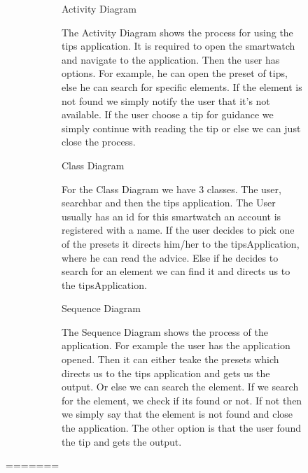 \documentclass{article}
\begin{document}
		\begin{figure}[htbp]
			\centering
			\begin{subfigure}{\textwidth}
				\resizebox{\textwidth}{!}{}
				\caption{Activity Diagram}
			\end{subfigure}
			\begin{subfigure}{\textwidth}
				The Activity Diagram shows the process for using the tips application. It is required to open the smartwatch and 
				navigate to the application. Then the user has options. For example, he can open the preset of tips, else he can search
				for specific elements. If the element is not found we simply notify the user that it's not available. 
				If the user choose a tip for guidance we simply continue with reading the tip or else we can just close the process. 
			\end{subfigure}
		\end{figure}
		\newpage

		\begin{figure}[htbp]
			\centering
			\begin{subfigure}{\textwidth}
				\resizebox{\textwidth}{!}{}
				\caption{Class Diagram}
			\end{subfigure}
			\begin{subfigure}{\textwidth}
				For the Class Diagram we have 3 classes. The user, searchbar and then the tips application. The User usually 
				has an id for this smartwatch an account is registered with a name. If the user decides to pick one of the presets
				it directs him/her to the tipsApplication, where he can read the advice. Else if he decides to search for an element 
				we can find it and directs us to the tipsApplication. 
			\end{subfigure}
		\end{figure}
		\newpage

		\begin{figure}[htbp]
			\centering
			\begin{subfigure}{\textwidth}
				\resizebox{\textwidth}{!}{}
				\caption{Sequence Diagram}
			\end{subfigure}
			\begin{subfigure}{\textwidth}
				The Sequence Diagram shows the process of the application. For example the user has the application opened. Then it can
				either teake the presets which directs us to the tips application and gets us the output. Or else we can search the element. 
				If we search for the element, we check if its found or not. If not then we simply say that the element is not found and close the application. 
				The other option is that the user found the tip and gets the output. 
			\end{subfigure}
		\end{figure}
		\newpage
=======
\end{document}
